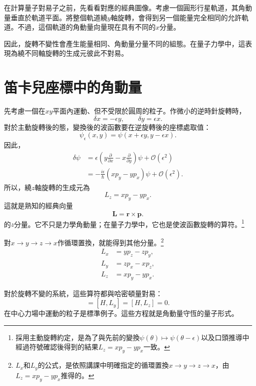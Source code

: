 在計算量子對易子之前，先看看對應的經典圖像。考慮一個圓形行星軌道，其角動量垂直於軌道平面。將整個軌道繞\(y\)軸旋轉，會得到另一個能量完全相同的允許軌道。不過，這個軌道的角動量向量現在具有不同的\(x\)分量。

因此，旋轉不變性會產生能量相同、角動量分量不同的組態。在量子力學中，這表現為繞不同軸旋轉的生成元彼此不對易。

\section{笛卡兒座標中的角動量}

先考慮一個在\(xy\)平面內運動、但不受限於圓周的粒子。作微小的逆時針旋轉時，
\begin{equation}
\delta x=-\epsilon y,
\qquad
\delta y=\epsilon x.
\end{equation}
對於主動旋轉後的態，變換後的波函數要在逆旋轉後的座標處取值：
\begin{equation}
\psi_\epsilon(x,y)
=\psi(x+\epsilon y,y-\epsilon x).
\end{equation}
因此，
\begin{align}
\delta\psi
&=\epsilon\left(
y\frac{\partial}{\partial x}
-x\frac{\partial}{\partial y}
\right)\psi
+\mathcal O(\epsilon^2)\\
&=-\frac{i\epsilon}{\hbar}
\left(xp_y-yp_x\right)\psi
+\mathcal O(\epsilon^2).
\end{align}
所以，繞\(z\)軸旋轉的生成元為
\begin{equation}
L_z=xp_y-yp_x.
\end{equation}
這就是熟知的經典向量
\begin{equation}
\mathbf L=\mathbf r\times\mathbf p.
\end{equation}
的\(z\)分量。它不只是力學角動量；在量子力學中，它也是使波函數旋轉的算符。\footnote{採用主動旋轉約定，是為了與先前的變換\(\psi(\theta)\mapsto\psi(\theta-\epsilon)\)以及口頭推導中經過符號確認後得到的結果\(L_z=xp_y-yp_x\)一致。}

對\(x\to y\to z\to x\)作循環置換，就能得到其他分量。\footnote{\(L_x\)和\(L_y\)的公式，是依照講課中明確指定的循環置換\(x\to y\to z\to x\)，由\(L_z=xp_y-yp_x\)推得的。}
\begin{align}
L_x&=yp_z-zp_y,\\
L_y&=zp_x-xp_z,\\
L_z&=xp_y-yp_x.
\end{align}

對於旋轉不變的系統，這些算符都與哈密頓量對易：
\begin{equation}
[H,L_x]=[H,L_y]=[H,L_z]=0.
\end{equation}
在中心力場中運動的粒子是標準例子。這些方程就是角動量守恆的量子形式。

